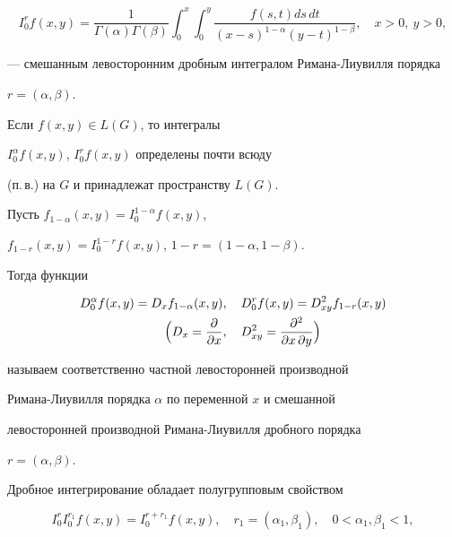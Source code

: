 \begin{equation} 


I_0^r f(x,y)=\frac{1}{\Gamma(\alpha)\Gamma(\beta)} 


\int^x_0\int^y_0 


\frac{f(s,t)ds\,dt}{(x-s)^{1-\alpha}(y-t)^{1-\beta}}, 


\quad x>0, \ y>0, 


\end{equation} 


--- смешанным левосторонним дробным интегралом Римана-Лиувилля порядка 


$r=(\alpha,\beta)$. 


Если $f(x,y)\in L(G)$, то \cite{Sam} интегралы 


$I_0^\alpha f(x,y)$, $I_0^r f(x,y)$ определены почти всюду 


(п.\,в.) на $G$ и принадлежат пространству $L(G)$. 


 


Пусть $f_{1-\alpha}(x,y)=I_0^{1-\alpha}f(x,y)$, 


$f_{1-r}(x,y)=I_0^{1-r}f(x,y)$, $1-r=(1-\alpha,1-\beta)$. 


Тогда функции 


\begin{align} 


\begin{split} 


D_0^\alpha f(x,y)=D_x f_{1-\alpha}(x,y)&,\quad 


D_0^r f(x,y)=D^2_{xy}f_{1-r}(x,y)\\ 


\Bigl( D_x=\frac{\partial}{\partial x}&,\quad 


D^2_{xy}=\frac{\partial^2}{\partial x\,\partial y}\Bigr) 


\end{split} 


\end{align} 


называем \cite{Sam} соответственно частной левосторонней производной 


Римана-Лиувилля порядка $\alpha$ по переменной $x$ и смешанной 


левосторонней производной Римана-Лиувилля дробного порядка 


$r=(\alpha,\beta)$. 


Дробное интегрирование обладает полугрупповым свойством \cite{Sam} 


\begin{equation} 


I_0^r I_0^{r_1}f(x,y)=I_0^{r+r_1}f(x,y),\quad 


r_1=(\alpha_1,\beta_1),\quad 0<\alpha_1,\beta_1<1, 


\end{equation} 


